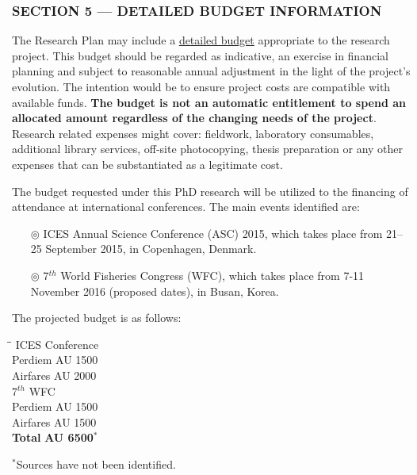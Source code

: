 \documentclass[11pt,a4paper,oneside]{report}
\begin{document}
\subsubsection*{SECTION 5 --- DETAILED BUDGET INFORMATION}
The Research Plan may include a  \ul{detailed budget} appropriate to the research project. This budget should be regarded as indicative, an exercise in financial planning and subject to reasonable annual adjustment in the light of the project’s evolution. The intention would be to ensure project costs are compatible with available funds. \textbf{The budget is not an automatic entitlement to spend an allocated amount regardless of the changing needs of the project}. Research related expenses might cover: fieldwork, laboratory consumables, additional library services, off-site photocopying, thesis preparation or any other expenses that can be substantiated as a legitimate cost.

\begin{mdframed}[everyline=true,splittopskip=20pt,splitbottomskip=20pt]
\vspace{2ex}
The budget requested under this PhD research will be utilized to the financing of attendance at international conferences. The main events identified are:

\begin{itemize}
\item[$\circledcirc$] ICES Annual Science Conference (ASC) 2015, which takes place from 21–25 September 2015, in Copenhagen, Denmark.
\item[$\circledcirc$] 7$^{th}$ World Fisheries Congress (WFC), which takes place from 7-11 November 2016 (proposed dates), in Busan, Korea.
\end{itemize}

The projected budget is as follows:

\begin{tabbing}
\hspace{1cm}\=\hspace{3cm}\=\kill
 ICES Conference \>   \>  \\ 
  \>  Perdiem \> AU 1500 \\
    \>  Airfares \> AU 2000 \\
     7$^{th}$ WFC \>   \>  \\ 
  \>  Perdiem \> AU 1500 \\
    \>  Airfares \> AU 1500 \\
         \textbf{Total} \>   \>  \textbf{AU 6500}$^*$
\end{tabbing}

$^*${\footnotesize Sources have not been identified.}
\vspace{2ex}
\end{mdframed}
\end{document}
